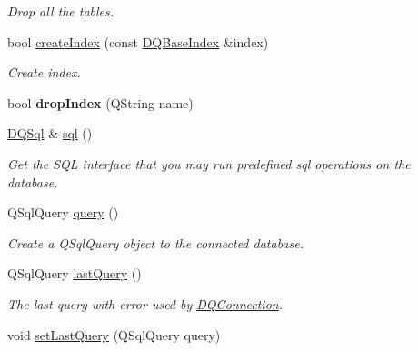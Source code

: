 \begin{DoxyCompactItemize}
\begin{DoxyCompactList}\small\item\em Drop all the tables. \item\end{DoxyCompactList}\item 
\hypertarget{classDQConnection_a640c6c481f46b8725d8103cf3efcb9d1}{
bool \hyperlink{classDQConnection_a640c6c481f46b8725d8103cf3efcb9d1}{createIndex} (const \hyperlink{classDQBaseIndex}{DQBaseIndex} \&index)}
\label{classDQConnection_a640c6c481f46b8725d8103cf3efcb9d1}

\begin{DoxyCompactList}\small\item\em Create index. \item\end{DoxyCompactList}\item 
\hypertarget{classDQConnection_a7563ea3bb90a1a822d82d3ab5f52274c}{
bool {\bfseries dropIndex} (QString name)}
\label{classDQConnection_a7563ea3bb90a1a822d82d3ab5f52274c}

\item 
\hypertarget{classDQConnection_abfef4315ba931c8e3343a50954e5fb98}{
\hyperlink{classDQSql}{DQSql} \& \hyperlink{classDQConnection_abfef4315ba931c8e3343a50954e5fb98}{sql} ()}
\label{classDQConnection_abfef4315ba931c8e3343a50954e5fb98}

\begin{DoxyCompactList}\small\item\em Get the SQL interface that you may run predefined sql operations on the database. \item\end{DoxyCompactList}\item 
\hypertarget{classDQConnection_a86de58b5b1df1b046c0a8e71c80eadaf}{
QSqlQuery \hyperlink{classDQConnection_a86de58b5b1df1b046c0a8e71c80eadaf}{query} ()}
\label{classDQConnection_a86de58b5b1df1b046c0a8e71c80eadaf}

\begin{DoxyCompactList}\small\item\em Create a QSqlQuery object to the connected database. \item\end{DoxyCompactList}\item 
QSqlQuery \hyperlink{classDQConnection_a6fd8ad7aac33f470f32c3e308825ab8e}{lastQuery} ()
\begin{DoxyCompactList}\small\item\em The last query with error used by \hyperlink{classDQConnection}{DQConnection}. \item\end{DoxyCompactList}\item 
void \hyperlink{classDQConnection_aaa2cf5aea1936b578dac2f3b4676783a}{setLastQuery} (QSqlQuery query)
\end{DoxyCompactItemize}
